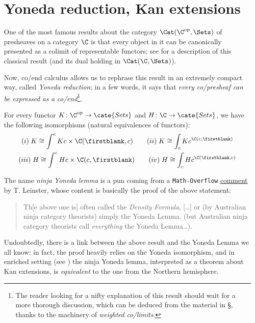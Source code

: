\section{Yoneda reduction, Kan extensions}\label{sec:tre}
One of the most famous results about the category $\Cat(\C^\text{op}, \Sets)$ of presheaves on a category $\C$ is that every object in it can be canonically presented as a colimit of representable functors; see \cite[Theorem \textbf{III.7.1}]{McL} for a description of this classical result (and its dual holding in $\Cat(\C, \Sets)$).

Now, co/end calculus allows us to rephrase this result in an extremely compact way, called \emph{Yoneda reduction}; in a few words, it says that \emph{every co/presheaf can be expressed as a co/end}\footnote{The reader looking for a nifty explanation of this result should wait for a more thorough discussion, which can be deduced from the material in \S{}, thanks to the machinery of \emph{weighted co/limits}.}.
\begin{proposition}\label{ninjayo}
For every functor $K\colon \C^\text{op}\to\cate{Sets}$ and $H\colon \C\to \cate{Sets}$, we have the following isomorphisms (natural equivalences of functors):
\begin{gather*}
(i)\; K\cong \int^cKc\times \C(\firstblank,c) \qquad (ii)\; K\cong \int_c Kc^{\C(c,\firstblank)}\\
(iii)\; H\cong \int^cHc\times \C(c,\firstblank) \qquad (iv)\; H\cong \int_cHc^{\C(\firstblank,c)}\\
\end{gather*}
\end{proposition}
\begin{remark}
The name \emph{ninja Yoneda lemma} is a pun coming from a \texttt{Math-Overflow} \href{http://mathoverflow.net/a/20451}{comment} by T\@. Leinster, whose content is basically the proof of the above statement:
\begin{quote}\small 
Th[e above one is] often called the \emph{Density Formula}, [\dots] or (by Australian ninja category theorists) simply the Yoneda Lemma. (but Australian ninja category theorists call \emph{everything} the Yoneda Lemma\dots).
\end{quote}
\end{remark}
Undoubtedly, there is a link between the above result and the Yoneda Lemma we all know: in fact, the proof heavily relies on the Yoneda isomorphism, and in enriched setting (see \cite[\S\textbf{I.5}]{dubuc1970kan}) the ninja Yoneda lemma, interpreted as a theorem about Kan extensions, is \emph{equivalent} to the one from the Northern hemisphere. 

